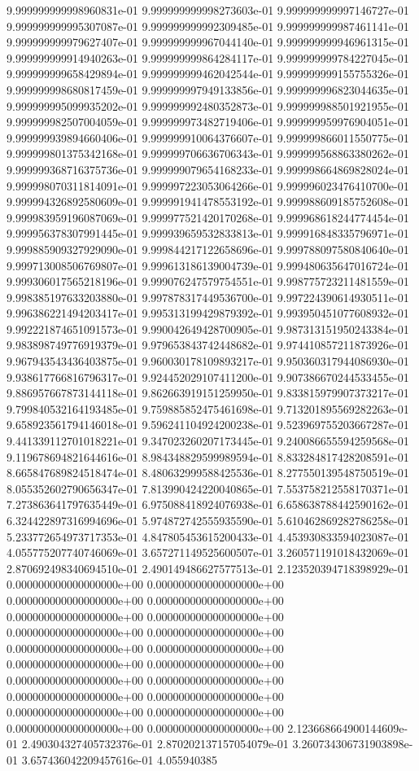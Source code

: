 9.999999999998960831e-01	9.999999999998273603e-01	9.999999999997146727e-01	9.999999999995307087e-01	9.999999999992309485e-01	9.999999999987461141e-01	9.999999999979627407e-01	9.999999999967044140e-01	9.999999999946961315e-01	9.999999999914940263e-01	9.999999999864284117e-01	9.999999999784227045e-01	9.999999999658429894e-01	9.999999999462042544e-01	9.999999999155755326e-01	9.999999998680817459e-01	9.999999997949133856e-01	9.999999996823044635e-01	9.999999995099935202e-01	9.999999992480352873e-01	9.999999988501921955e-01	9.999999982507004059e-01	9.999999973482719406e-01	9.999999959976904051e-01	9.999999939894660406e-01	9.999999910064376607e-01	9.999999866011550775e-01	9.999999801375342168e-01	9.999999706636706343e-01	9.999999568863380262e-01	9.999999368716375736e-01	9.999999079654168233e-01	9.999998664869828024e-01	9.999998070311814091e-01	9.999997223053064266e-01	9.999996023476410700e-01	9.999994326892580609e-01	9.999991941478553192e-01	9.999988609185752608e-01	9.999983959196087069e-01	9.999977521420170268e-01	9.999968618244774454e-01	9.999956378307991445e-01	9.999939659532833813e-01	9.999916848335796971e-01	9.999885909327929090e-01	9.999844217122658696e-01	9.999788097580840640e-01	9.999713008506769807e-01	9.999613186139004739e-01	9.999480635647016724e-01	9.999306017565218196e-01	9.999076247579754551e-01	9.998775723211481559e-01	9.998385197633203880e-01	9.997878317449536700e-01	9.997224390614930511e-01	9.996386221494203417e-01	9.995313199429879392e-01	9.993950451077608932e-01	9.992221874651091573e-01	9.990042649428700905e-01	9.987313151950243384e-01	9.983898749776919379e-01	9.979653843742448682e-01	9.974410857211873926e-01	9.967943543436403875e-01	9.960030178109893217e-01	9.950360317944086930e-01	9.938617766816796317e-01	9.924452029107411200e-01	9.907386670244533455e-01	9.886957667873144118e-01	9.862663919151259950e-01	9.833815979907373217e-01	9.799840532164193485e-01	9.759885852475461698e-01	9.713201895569282263e-01	9.658923561794146018e-01	9.596241104924200238e-01	9.523969755203667287e-01	9.441339112701018221e-01	9.347023260207173445e-01	9.240086655594259568e-01	9.119678694821644616e-01	8.984348829599989594e-01	8.833284817428208591e-01	8.665847689824518474e-01	8.480632999588425536e-01	8.277550139548750519e-01	8.055352602790656347e-01	7.813990424220040865e-01	7.553758212558170371e-01	7.273863641797635449e-01	6.975088418924076938e-01	6.658638788442590162e-01	6.324422897316994696e-01	5.974872742555935590e-01	5.610462869282786258e-01	5.233772654973717353e-01	4.847805453615200433e-01	4.453930833594023087e-01	4.055775207740746069e-01	3.657271149525600507e-01	3.260571191018432069e-01	2.870692498340694510e-01	2.490149486627577513e-01	2.123520394718398929e-01	0.000000000000000000e+00	0.000000000000000000e+00	0.000000000000000000e+00	0.000000000000000000e+00	0.000000000000000000e+00	0.000000000000000000e+00	0.000000000000000000e+00	0.000000000000000000e+00	0.000000000000000000e+00	0.000000000000000000e+00	0.000000000000000000e+00	0.000000000000000000e+00	0.000000000000000000e+00	0.000000000000000000e+00	0.000000000000000000e+00	0.000000000000000000e+00	0.000000000000000000e+00	0.000000000000000000e+00	0.000000000000000000e+00	0.000000000000000000e+00	2.123668664900144609e-01	2.490304327405732376e-01	2.870202137157054079e-01	3.260734306731903898e-01	3.657436042209457616e-01	4.055940385